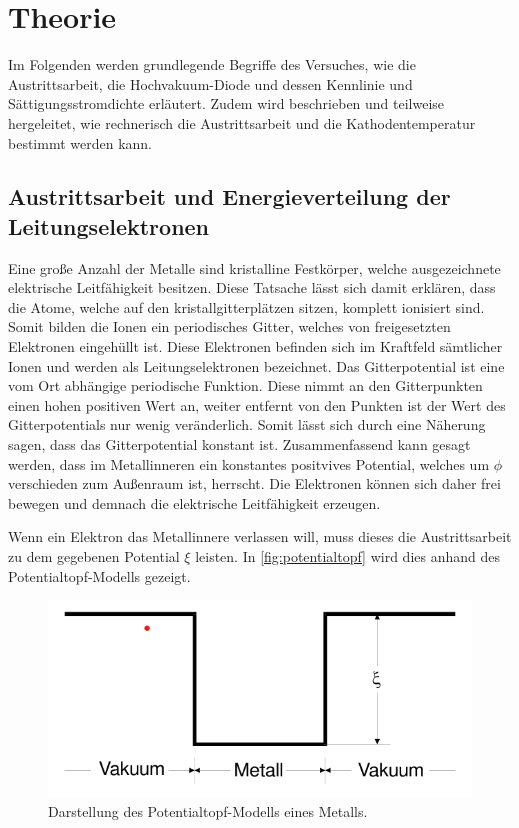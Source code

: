 \section{Theorie}
\label{sec:theorie}

Im Folgenden werden grundlegende Begriffe des Versuches, wie die Austrittsarbeit, die Hochvakuum-Diode und dessen Kennlinie und Sättigungsstromdichte erläutert.
Zudem wird beschrieben und teilweise hergeleitet, wie rechnerisch die Austrittsarbeit und die Kathodentemperatur bestimmt werden kann.

\subsection{Austrittsarbeit und Energieverteilung der Leitungselektronen}
\label{sec:Begriffe der Austrittsarbeit und die Energieverteilung der Leitungselektronen}

Eine große Anzahl der Metalle sind kristalline Festkörper, welche ausgezeichnete elektrische Leitfähigkeit besitzen.
Diese Tatsache lässt sich damit erklären, dass die Atome, welche auf den kristallgitterplätzen sitzen, komplett ionisiert sind.
Somit bilden die Ionen ein periodisches Gitter, welches von freigesetzten Elektronen eingehüllt ist.
Diese Elektronen befinden sich im Kraftfeld sämtlicher Ionen und werden als Leitungselektronen bezeichnet.
Das Gitterpotential ist eine vom Ort abhängige periodische Funktion. Diese nimmt an den Gitterpunkten einen hohen positiven Wert an,
weiter entfernt von den Punkten ist der Wert des Gitterpotentials nur wenig veränderlich. Somit lässt sich durch eine
Näherung sagen, dass das Gitterpotential konstant ist. Zusammenfassend kann gesagt werden, dass im Metallinneren ein konstantes 
positvives Potential, welches um $\phi$ verschieden zum Außenraum ist, herrscht. Die Elektronen können sich daher 
frei bewegen und demnach die elektrische Leitfähigkeit erzeugen.

Wenn ein Elektron das Metallinnere verlassen will, muss dieses die Austrittsarbeit zu dem gegebenen Potential $\xi$ leisten.
In \autoref{fig:potentialtopf} wird dies anhand des Potentialtopf-Modells gezeigt.
\begin{figure}[H]
    \centering
    \includegraphics[width=0.5\linewidth]{content/grafik/potential.png}
    \caption{Darstellung des Potentialtopf-Modells eines Metalls.\cite{elektron}}
    \label{fig:potentialtopf}
\end{figure}

